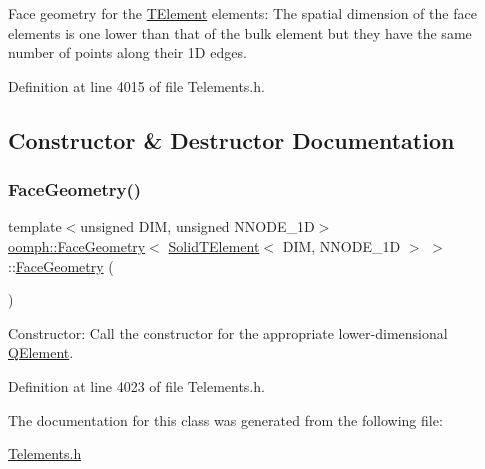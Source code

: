 Face geometry for the \hyperlink{classoomph_1_1TElement}{T\+Element} elements\+: The spatial dimension of the face elements is one lower than that of the bulk element but they have the same number of points along their 1D edges. 

Definition at line 4015 of file Telements.\+h.



\subsection{Constructor \& Destructor Documentation}
\mbox{\label{classoomph_1_1FaceGeometry_3_01SolidTElement_3_01DIM_00_01NNODE__1D_01_4_01_4_a423be6d59358b48a7b173b5ee2cf2634}} 
\subsubsection{\texorpdfstring{Face\+Geometry()}{FaceGeometry()}}
{\footnotesize\ttfamily template$<$unsigned D\+IM, unsigned N\+N\+O\+D\+E\+\_\+1D$>$ \\
\hyperlink{classoomph_1_1FaceGeometry}{oomph\+::\+Face\+Geometry}$<$ \hyperlink{classoomph_1_1SolidTElement}{Solid\+T\+Element}$<$ D\+IM, N\+N\+O\+D\+E\+\_\+1D $>$ $>$\+::\hyperlink{classoomph_1_1FaceGeometry}{Face\+Geometry} (\begin{DoxyParamCaption}{ }\end{DoxyParamCaption})\hspace{0.3cm}{\ttfamily [inline]}}



Constructor\+: Call the constructor for the appropriate lower-\/dimensional \hyperlink{classoomph_1_1QElement}{Q\+Element}. 



Definition at line 4023 of file Telements.\+h.



The documentation for this class was generated from the following file\+:\begin{DoxyCompactItemize}
\item 
\hyperlink{Telements_8h}{Telements.\+h}\end{DoxyCompactItemize}
